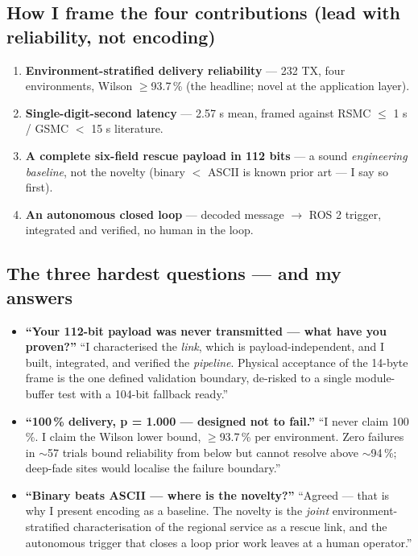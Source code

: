 \documentclass[11pt,a4paper]{article}
\begin{document}
\subsection{How I frame the four contributions (lead with reliability, not encoding)}
\begin{enumerate}[leftmargin=1.6em,itemsep=1pt]
  \item \textbf{Environment-stratified delivery reliability} --- 232 TX, four environments,
        Wilson $\ge$93.7\,\% (the headline; novel at the application layer).
  \item \textbf{Single-digit-second latency} --- 2.57 s mean, framed against RSMC $\le$ 1 s /
        GSMC $<$ 15 s literature.
  \item \textbf{A complete six-field rescue payload in 112 bits} --- a sound \emph{engineering
        baseline}, not the novelty (binary $<$ ASCII is known prior art --- I say so first).
  \item \textbf{An autonomous closed loop} --- decoded message $\to$ ROS 2 trigger,
        integrated and verified, no human in the loop.
\end{enumerate}

\subsection{The three hardest questions --- and my answers}
\begin{itemize}[leftmargin=1.4em,itemsep=3pt]
  \item \textbf{``Your 112-bit payload was never transmitted --- what have you proven?''}
        ``I characterised the \emph{link}, which is payload-independent, and I built,
        integrated, and verified the \emph{pipeline}. Physical acceptance of the 14-byte frame
        is the one defined validation boundary, de-risked to a single module-buffer test with
        a 104-bit fallback ready.''
  \item \textbf{``100\,\% delivery, p = 1.000 --- designed not to fail.''}
        ``I never claim 100\,\%. I claim the Wilson lower bound, $\ge$93.7\,\% per
        environment. Zero failures in $\sim$57 trials bound reliability from below but cannot
        resolve above $\sim$94\,\%; deep-fade sites would localise the failure boundary.''
  \item \textbf{``Binary beats ASCII --- where is the novelty?''}
        ``Agreed --- that is why I present encoding as a baseline. The novelty is the
        \emph{joint} environment-stratified characterisation of the regional service as a
        rescue link, and the autonomous trigger that closes a loop prior work leaves at a
        human operator.''
\end{itemize}
\end{document}
